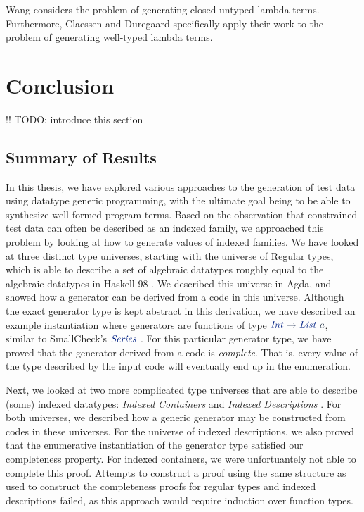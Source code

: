 \documentclass[a4paper,msc,twosized=semi]{uustthesis}
\newcommand*{\mathcolor}{}
\def\mathcolor#1#{\mathcoloraux{#1}}
\newcommand*{\mathcoloraux}[3]{%
  \protect\leavevmode
  \begingroup
    \color#1{#2}#3%
  \endgroup
}
\newcommand{\HSSym}[1]{\mathcolor{hsblue4}{#1}}
\newcommand{\HSCon}[1]{\mathcolor{hsblue3}{\mathit{#1}}}
\newcommand{\HSVar}[1]{\mathcolor{hsblue5}{\mathit{#1}}}
\begin{document}
  Wang \cite{wang2005generating} considers the problem of generating closed untyped 
  lambda terms. Furthermore, Claessen and Duregaard \cite{claessen2015generating} specifically apply their work to the problem of generating well-typed lambda terms. 

\section{Conclusion}

  !! TODO: introduce this section

\subsection{Summary of Results}

  In this thesis, we have explored various approaches to the generation of test data using datatype generic programming, with the ultimate goal being to be able to synthesize well-formed program terms. Based on the observation that constrained test data can often be described as an indexed family, we approached this problem by looking at how to generate values of indexed families. We have looked at three distinct type universes, starting with the universe of Regular types, which is able to describe a set of algebraic datatypes roughly equal to the algebraic datatypes in Haskell 98 \cite{jones2003haskell}. We described this universe in Agda, and showed how a generator can be derived from a code in this universe. Although the exact generator type is kept abstract in this derivation, we have described an example instantiation where generators are functions of type \ensuremath{\HSCon{Int}\HSSym{\to} \HSCon{List}\;\HSVar{a}}, similar to SmallCheck's \ensuremath{\HSCon{Series}} \cite{runciman2008smallcheck}. For this particular generator type, we have proved that the generator derived from a code is \emph{complete}. That is, every value of the type described by the input code will eventually end up in the enumeration. 

  Next, we looked at two more complicated type universes that are able to describe (some) indexed datatypes: \emph{Indexed Containers} \cite{altenkirch2015indexed} and \emph{Indexed Descriptions} \cite{dagand2013cosmology}. For both universes, we described how a generic generator may be constructed from codes in these universes. For the universe of indexed descriptions, we also proved that the enumerative instantiation of the generator type satisfied our completeness property. For indexed containers, we were unfortuantely not able to complete this proof. Attempts to construct a proof using the same structure as used to construct the completeness proofs for regular types and indexed descriptions failed, as this approach would require induction over function types. 
\end{document}
